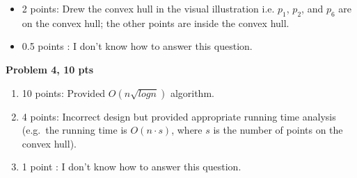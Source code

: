 \documentclass[11pt]{article}
\begin{document}
\begin{qunlist}
\begin{enumerate}
\begin{itemize}
        \item 2 points: Drew the convex hull in the visual illustration i.e. $p_1$, $p_2$, and $p_6$ are on the convex hull; the other points are inside the convex hull.
        \item 0.5 points : I don’t know how to answer this question.
    \end{itemize}
\end{enumerate}
{\bf Problem 4, 10 pts}
\begin{enumerate}
    \item 10 points: Provided $O(n \sqrt{log n} )$ algorithm.
    \item 4 points: Incorrect design but provided appropriate running time analysis (e.g.~the running time is $O(n\cdot s)$, where $s$ is the number of points on the convex hull).
    \item 1 point : I don’t know how to answer this question.
\end{enumerate}


\end{qunlist}
\end{document}
